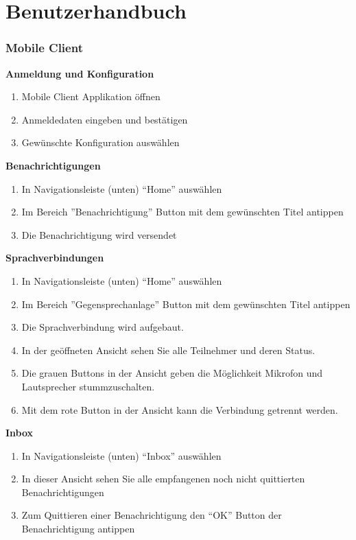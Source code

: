 \section{Benutzerhandbuch}

\subsubsection*{Mobile Client}

\textbf{Anmeldung und Konfiguration}

\begin{enumerate}
    \item Mobile Client Applikation öffnen
    \item Anmeldedaten eingeben und bestätigen
    \item Gewünschte Konfiguration auswählen
\end{enumerate}

\textbf{Benachrichtigungen}

\begin{enumerate}
    \item In Navigationsleiste (unten) ``Home'' auswählen
    \item Im Bereich ''Benachrichtigung'' Button mit dem gewünschten Titel antippen
    \item Die Benachrichtigung wird versendet
\end{enumerate}

\textbf{Sprachverbindungen}

\begin{enumerate}
    \item In Navigationsleiste (unten) ``Home'' auswählen
    \item Im Bereich ''Gegensprechanlage'' Button mit dem gewünschten Titel antippen
    \item Die Sprachverbindung wird aufgebaut.
    \item In der geöffneten Ansicht sehen Sie alle Teilnehmer und deren Status.
    \item Die grauen Buttons in der Ansicht geben die Möglichkeit Mikrofon und Lautsprecher stummzuschalten.
    \item Mit dem rote Button in der Ansicht kann die Verbindung getrennt werden.
\end{enumerate}

\textbf{Inbox}

\begin{enumerate}
    \item In Navigationsleiste (unten) ``Inbox'' auswählen
    \item In dieser Ansicht sehen Sie alle empfangenen noch nicht quittierten Benachrichtigungen
    \item Zum Quittieren einer Benachrichtigung den ``OK'' Button der Benachrichtigung antippen
\end{enumerate}

